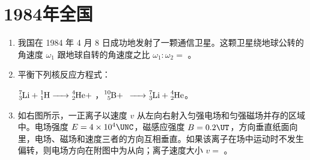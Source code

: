 \documentclass[\gkver]{gaokaozhenti}
\begin{document}
\chapter{1984年全国}

\begin{enumerate}
\item
我国在 1984 年 4 月 8 日成功地发射了一颗通信卫星。这颗卫星绕地球公转的角速度 $\omega_{1}$ 跟地球自转的角速度之比 $\omega_{1}:\omega_{2} =$ 。

\item
平衡下列核反应方程式：

$\ce{^{7}_{3}Li + ^{1}_{1}H -> ^{4}_{2}He} +$ ，$\ce{^{10}_{5}B} +$  $\ce{-> ^{7}_{3}Li + ^{4}_{2}He}$。

\item
如右图所示，一正离子以速度 $v$ 从左向右射入匀强电场和匀强磁场并存的区域中。电场强度 $E = 4\times10^{4}\UNC$，磁感应强度 $B = 0.2\UT$，方向垂直纸面向里，电场、磁场和速度三者的方向互相垂直。如果该离子在场中运动时不发生偏转，则电场方向在附图中为从向；离子速度大小 $v =$ 。
\end{enumerate}
\end{document}
